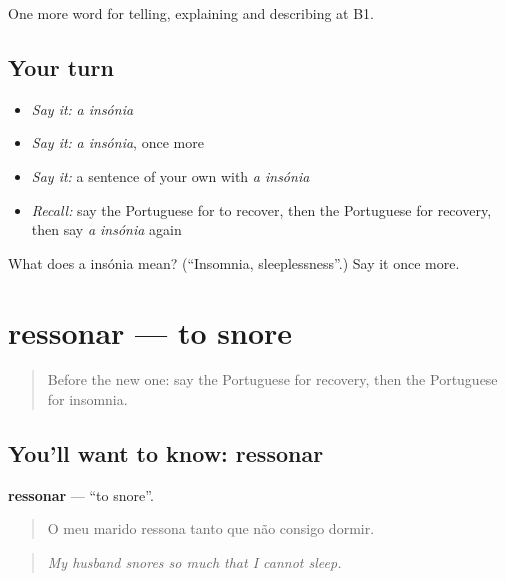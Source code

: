 \begin{grammarlens}[title={What you've built}]
One more word for telling, explaining and describing at B1.
\end{grammarlens}

\subsection*{Your turn}
\begin{itemize}
\raggedright
  \item \emph{Say it:} \emph{a insónia}
  \item \emph{Say it:} \emph{a insónia}, once more
  \item \emph{Say it:} a sentence of your own with \emph{a insónia}
  \item \emph{Recall:} say the Portuguese for to recover, then the Portuguese for recovery, then say \emph{a insónia} again
\end{itemize}

\begin{tcolorbox}[breakable,colback=teal!4,colframe=teal!35!black,title={Before you move on}]
What does a insónia mean? (\textquotedblleft{}Insomnia, sleeplessness\textquotedblright{}.) Say it once more.
\end{tcolorbox}
\section[ressonar]{ressonar — to snore}

\label{lesson:PT-C489-ressonar}



\begin{quote}
Before the new one: say the Portuguese for recovery, then the Portuguese for insomnia.
\end{quote}

\subsection*{You'll want to know: ressonar}
\textbf{ressonar} — \textquotedblleft{}to snore\textquotedblright{}.

\begin{quote}
O meu marido ressona tanto que não consigo dormir.
\end{quote}

\begin{quote}
\emph{My husband snores so much that I cannot sleep.}
\end{quote}

